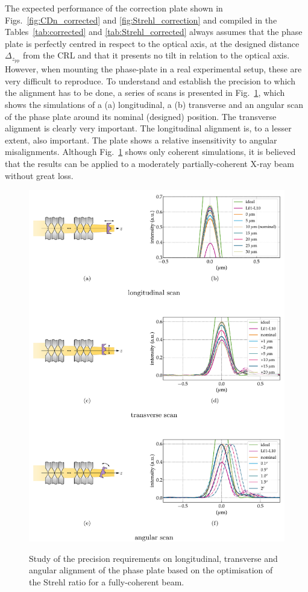 \begin{refsection}
The expected performance of the correction plate shown in Figs.~\ref{fig:CDn_corrected} and \ref{fig:Strehl_correction} and compiled in the Tables~\ref{tab:corrected} and \ref{tab:Strehl_corrected} always assumes that the phase plate is perfectly centred in respect to the optical axis, at the designed distance $\Delta_{z_\text{pp}}$ from the CRL and that it presents no tilt in relation to the optical axis. However, when mounting the phase-plate in a real experimental setup, these are very difficult to reproduce. To understand and establish the precision to which the alignment has to be done, a series of scans is presented in Fig.~\ref{fig:tolerancing}, which shows the simulations of a (a) longitudinal, a (b) transverse and an angular scan of the phase plate around its nominal (designed) position. The transverse alignment is clearly very important. The longitudinal alignment is, to a lesser extent, also important. The plate shows a relative insensitivity to angular misalignments. Although Fig.~\ref{fig:tolerancing} shows only coherent simulations, it is believed that the results can be applied to a moderately partially-coherent X-ray beam without great loss.

\begin{figure}[h]
        \centering
        {\includegraphics[width=0.7\linewidth]{figures/ch06/sensitivity_test.pdf}}
        \caption[Alignment sensitivity scan for the corrected system]{Study of the precision requirements on longitudinal, transverse and angular alignment of the phase plate based on the optimisation of the Strehl ratio for a fully-coherent beam.}\label{fig:tolerancing}
\end{figure}


\end{refsection}
